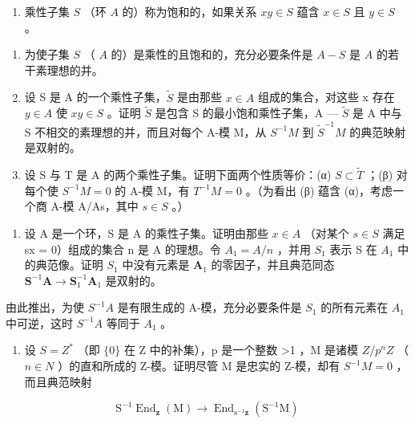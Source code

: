 
\begin{enumerate}
\def\labelenumi{\arabic{enumi}.}
\tightlist
\item
  乘性子集 \(S\) （环 \(A\) 的）称为饱和的，如果关系 \(xy \in S\) 蕴含 \(x \in S\) 且 \(y \in S\) 。
\end{enumerate}

\begin{enumerate}
\def\labelenumi{(\alph{enumi})}
\item
  为使子集 \(S\) （ \(A\) 的）是乘性的且饱和的，充分必要条件是 \(A - S\) 是 \(A\) 的若干素理想的并。
\item
  设 S 是 A 的一个乘性子集，\(\tilde{S}\) 是由那些 \(x \in A\) 组成的集合，对这些 x 存在 \(y \in A\) 使 \(xy \in S\) 。证明 \(\tilde{S}\) 是包含 S 的最小饱和乘性子集，A --- \(\tilde{S}\) 是 A 中与 S 不相交的素理想的并，而且对每个 A-模 M，从 \(S^{-1}M\) 到 \(\tilde{S}^{-1}M\) 的典范映射是双射的。
\item
  设 S 与 T 是 A 的两个乘性子集。证明下面两个性质等价：(α) \(S \subset \tilde{T}\) ；(β) 对每个使 \(S^{-1}M = 0\) 的 A-模 M，有 \(T^{-1}M = 0\) 。（为看出 (β) 蕴含 (α)，考虑一个商 A-模 A/As，其中 \(s \in S\) 。）
\end{enumerate}

\begin{enumerate}
\def\labelenumi{\arabic{enumi}.}
\setcounter{enumi}{1}
\tightlist
\item
  设 A 是一个环，S 是 A 的乘性子集。证明由那些 \(x \in A\) （对某个 \(s \in S\) 满足 sx = 0）组成的集合 n 是 A 的理想。令 \(A_{1} = A/n\) ，并用 \(S_{1}\) 表示 S 在 \(A_{1}\) 中的典范像。证明 \(S_{1}\) 中没有元素是 \(\mathbf{A}_1\) 的零因子，并且典范同态 \(\mathbf{S}^{-1}\mathbf{A} \to \mathbf{S}_1^{-1}\mathbf{A}_1\) 是双射的。
\end{enumerate}

由此推出，为使 \(S^{-1}A\) 是有限生成的 A-模，充分必要条件是 \(S_{1}\) 的所有元素在 \(A_{1}\) 中可逆，这时 \(S^{-1}A\) 等同于 \(A_{1}\) 。

\begin{enumerate}
\def\labelenumi{\arabic{enumi}.}
\setcounter{enumi}{2}
\tightlist
\item
  设 \(S = Z^{*}\) （即 \(\{0\}\) 在 Z 中的补集），p 是一个整数 \textgreater1 ，M 是诸模 \(Z/p^{n}Z\) （ \(n \in N\) ）的直和所成的 Z-模。证明尽管 M 是忠实的 Z-模，却有 \(S^{-1}M = 0\) ，而且典范映射
\end{enumerate}

\[
\mathrm{S} ^ {- 1} \operatorname{End} _ {\mathbf {z}} (\mathrm{M}) \rightarrow \operatorname{End} _ {\mathrm{s} ^ {- 1} \mathbf {z}} (\mathrm{S} ^ {- 1} \mathrm{M})
\]

